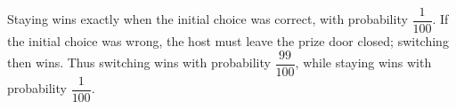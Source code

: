 Staying wins exactly when the initial choice was correct, with probability $\dfrac{1}{100}$. If the initial choice was wrong, the host must leave the prize door closed; switching then wins. Thus switching wins with probability $\boxed{\dfrac{99}{100}}$, while staying wins with probability $\boxed{\dfrac{1}{100}}$.
